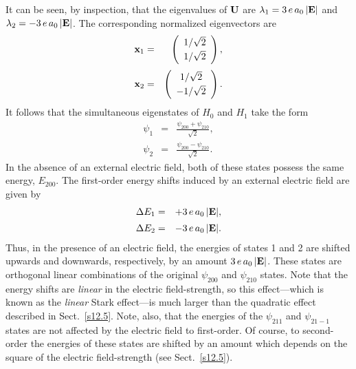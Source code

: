 It can be seen, by inspection, that the eigenvalues of ${\bf U}$
are $\lambda_1=3\,e\,a_0\,|{\bf E}|$ and $\lambda_2=-3\,e\,a_0\,|{\bf E}|$. The corresponding normalized eigenvectors are
\begin{eqnarray}
{\bf x}_1&=&\left(\begin{array}{c}
1/\sqrt{2}\\[0.5ex]
1/\sqrt{2}\end{array}\right),\\[0.5ex]
{\bf x}_2&=&\left(\begin{array}{c}
1/\sqrt{2}\\[0.5ex]
-1/\sqrt{2}\end{array}\right).
\end{eqnarray}
It follows that the simultaneous eigenstates of $H_0$ and $H_1$ take the form
\begin{eqnarray}
\psi_1 &=& \frac{\psi_{200} + \psi_{210}}{\sqrt{2}},\\[0.5ex]
\psi_2 &=& \frac{\psi_{200} -\psi_{210}}{\sqrt{2}}.
\end{eqnarray}
In the absence of an external electric field, both of these states possess the
same energy, $E_{200}$. The first-order energy shifts induced by
an external electric field are given by
\begin{eqnarray}
\Delta E_1 &=& +3\,e\,a_0\,|{\bf E}|,\\[0.5ex]
\Delta E_2 &=& -3\,e\,a_0\,|{\bf E}|.
\end{eqnarray}
Thus, in the presence of
an electric field, the energies of states 1 and 2 are shifted upwards and downwards, respectively, by an amount $3\,e\,a_0\,|{\bf E}|$. These states are orthogonal linear combinations of the
original $\psi_{200}$ and $\psi_{210}$ states. Note that the energy shifts
are {\em linear}\/ in the electric field-strength, so this effect---which is
known as the {\em linear}\/ Stark effect---is  much larger  than the quadratic effect described in Sect.~\ref{s12.5}. 
Note, also, that the energies of the $\psi_{211}$ and $\psi_{21-1}$ states are not affected by the electric field to first-order. Of course,
to second-order the energies of these states are shifted by an amount
which depends on the square of the electric field-strength (see Sect.~\ref{s12.5}).

